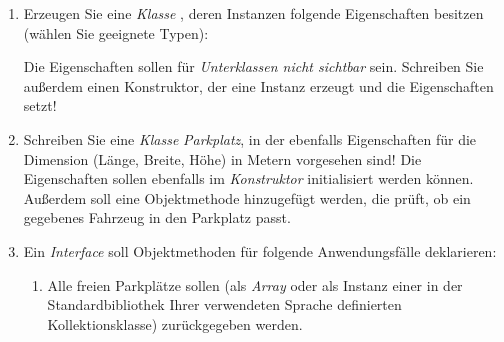 \documentclass{lehramt-informatik-aufgabe}
\begin{document}
\begin{enumerate}


\item Erzeugen Sie eine \emph{Klasse}
, deren Instanzen folgende Eigenschaften besitzen
(wählen Sie geeignete Typen):


Die Eigenschaften sollen für \emph{Unterklassen nicht sichtbar} sein.
Schreiben Sie außerdem einen Konstruktor, der eine Instanz erzeugt und
die Eigenschaften setzt!

\begin{liAntwort}
\end{liAntwort}


\item Schreiben Sie eine \emph{Klasse} \emph{Parkplatz}, in der
ebenfalls Eigenschaften für die Dimension (Länge, Breite, Höhe) in
Metern vorgesehen sind! Die Eigenschaften sollen ebenfalls im
\emph{Konstruktor} initialisiert werden können. Außerdem soll eine
Objektmethode hinzugefügt werden, die prüft, ob ein gegebenes Fahrzeug
in den Parkplatz passt.

\begin{liAntwort}
\end{liAntwort}


\item Ein \emph{Interface}  soll Objektmethoden für
folgende Anwendungsfälle deklarieren:

\begin{enumerate}


\item Alle freien Parkplätze sollen (\zB als \emph{Array} oder als
Instanz einer in der Standardbibliothek Ihrer verwendeten Sprache
definierten Kollektionsklasse) zurückgegeben werden.


\end{enumerate}
\end{enumerate}
\end{document}
